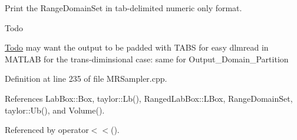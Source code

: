 \-Print the \-Range\-Domain\-Set in tab-\/delimited numeric only format. 

\begin{DoxyRefDesc}{\-Todo}
\item[\hyperlink{todo__todo000004}{\-Todo}]may want the output to be padded with \-T\-A\-B\-S for easy dlmread in \-M\-A\-T\-L\-A\-B for the trans-\/diminsional case\-: same for \-Output\-\_\-\-Domain\-\_\-\-Partition \end{DoxyRefDesc}


\-Definition at line 235 of file \-M\-R\-Sampler.\-cpp.



\-References \-Lab\-Box\-::\-Box, taylor\-::\-Lb(), \-Ranged\-Lab\-Box\-::\-L\-Box, \-Range\-Domain\-Set, taylor\-::\-Ub(), and \-Volume().



\-Referenced by operator$<$$<$().


